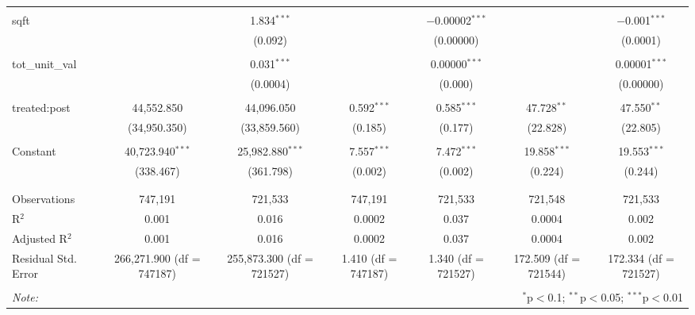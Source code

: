 \begin{table}[H]
{\begin{tabular}{@{\extracolsep{5pt}}lcccccc}
   & & & & & & \\  

  sqft &  & 1.834$^{***}$ &  & $-$0.00002$^{***}$ &  & $-$0.001$^{***}$ \\  

   &  & (0.092) &  & (0.00000) &  & (0.0001) \\  

   & & & & & & \\  

  tot\_unit\_val &  & 0.031$^{***}$ &  & 0.00000$^{***}$ &  & 0.00001$^{***}$ \\  

   &  & (0.0004) &  & (0.000) &  & (0.00000) \\  

   & & & & & & \\  

  treated:post & 44,552.850 & 44,096.050 & 0.592$^{***}$ & 0.585$^{***}$ & 47.728$^{**}$ & 47.550$^{**}$ \\  

   & (34,950.350) & (33,859.560) & (0.185) & (0.177) & (22.828) & (22.805) \\  

   & & & & & & \\  

  Constant & 40,723.940$^{***}$ & 25,982.880$^{***}$ & 7.557$^{***}$ & 7.472$^{***}$ & 19.858$^{***}$ & 19.553$^{***}$ \\  

   & (338.467) & (361.798) & (0.002) & (0.002) & (0.224) & (0.244) \\  

   & & & & & & \\  

 \hline \\[-1.8ex]  

 Observations & 747,191 & 721,533 & 747,191 & 721,533 & 721,548 & 721,533 \\  

 R$^{2}$ & 0.001 & 0.016 & 0.0002 & 0.037 & 0.0004 & 0.002 \\  

 Adjusted R$^{2}$ & 0.001 & 0.016 & 0.0002 & 0.037 & 0.0004 & 0.002 \\  

 Residual Std. Error & 266,271.900 (df = 747187) & 255,873.300 (df = 721527) & 1.410 (df = 747187) & 1.340 (df = 721527) & 172.509 (df = 721544) & 172.334 (df = 721527) \\  

 \hline  

 \hline \\[-1.8ex]  

 \textit{Note:}  & \multicolumn{6}{r}{$^{*}$p$<$0.1; $^{**}$p$<$0.05; $^{***}$p$<$0.01} \\  

 \end{tabular}}  

 \end{table}  

